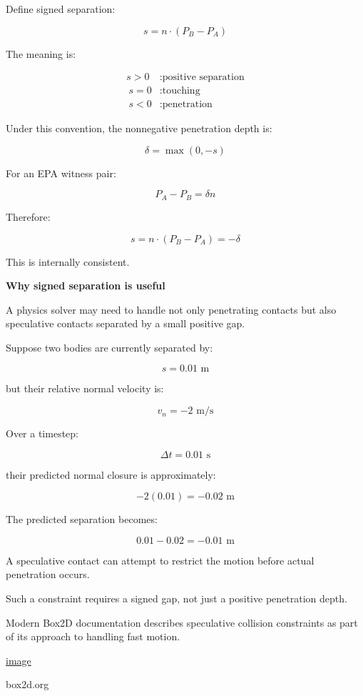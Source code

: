 Define signed separation:

\[
\boxed{ s=n\cdot(P_B-P_A) }
\]

The meaning is:

\[
\boxed{ \begin{aligned} s>0 &: \text{positive separation}\\\ s=0 &: \text{touching}\\\ s<0 &: \text{penetration} \end{aligned} }
\]

Under this convention, the nonnegative penetration depth is:

\[
\boxed{ \delta=\max(0,-s) }
\]

For an EPA witness pair:

\[
P_A-P_B=\delta n
\]

Therefore:

\[
s=n\cdot(P_B-P_A)=-\delta
\]

This is internally consistent.

\textbf{Why signed separation is useful}

A physics solver may need to handle not only penetrating contacts but also speculative contacts separated by a small positive gap.

Suppose two bodies are currently separated by:

\[
s=0.01\text{ m}
\]

but their relative normal velocity is:

\[
v_n=-2\text{ m/s}
\]

Over a timestep:

\[
\Delta t=0.01\text{ s}
\]

their predicted normal closure is approximately:

\[
-2(0.01)=-0.02\text{ m}
\]

The predicted separation becomes:

\[
0.01-0.02=-0.01\text{ m}
\]

A speculative contact can attempt to restrict the motion before actual penetration occurs.

Such a constraint requires a signed gap, not just a positive penetration depth.

Modern Box2D documentation describes speculative collision constraints as part of its approach to handling fast motion. 

\href{https://www.google.com/s2/favicons?domain=https://box2d.org&sz=32}{image}

box2d.org

